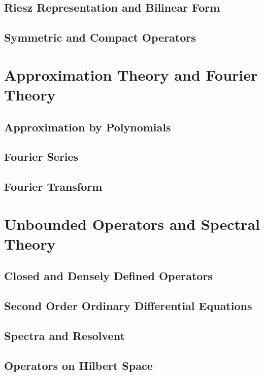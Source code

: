 \documentclass[a4paper, 12pt]{article}
\begin{document}
\subsection{Riesz Representation and Bilinear Form}


\subsection{Symmetric and Compact Operators}


\newpage
\section{Approximation Theory and Fourier Theory}

\subsection{Approximation by Polynomials}


\subsection{Fourier Series}


\subsection{Fourier Transform}


\newpage
\section{Unbounded Operators and Spectral Theory}
\subsection{Closed and Densely Defined Operators}


\subsection{Second Order Ordinary Differential Equations}


\subsection{Spectra and Resolvent}


\subsection{Operators on Hilbert Space}

\end{document}
